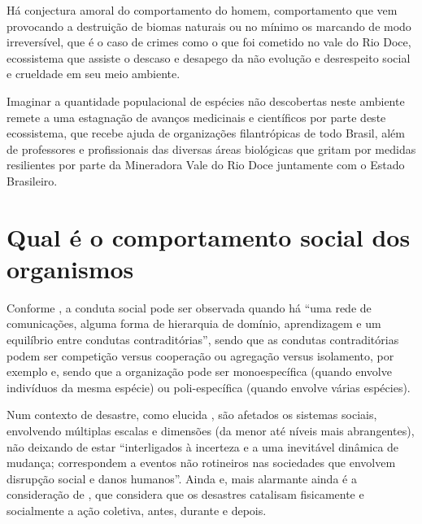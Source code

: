 \documentclass[
article,			%
11pt,				%
oneside,			%
a4paper,			%
english,			%
brazil,				%
sumario=tradicional
]{abntex2}
\begin{document}
	Há conjectura amoral do comportamento do homem, comportamento que vem provocando a destruição de biomas naturais ou no mínimo os marcando de modo irreversível, que é o caso de crimes como o que foi cometido no vale do Rio Doce, ecossistema que assiste o descaso e desapego da não evolução e desrespeito social e crueldade em seu meio ambiente.
	
	Imaginar a quantidade populacional de espécies não descobertas neste ambiente  remete a uma estagnação de avanços medicinais e científicos  por parte deste ecossistema, que recebe ajuda de organizações filantrópicas de todo Brasil, além de professores e profissionais das diversas áreas biológicas que gritam por medidas resilientes por parte da Mineradora Vale do Rio Doce juntamente com o Estado Brasileiro.
	
	\section{Qual é o comportamento social dos organismos} \label{s:comportamento}
	
	Conforme , a conduta social pode ser observada quando há ``uma rede de comunicações, alguma forma de hierarquia de domínio, aprendizagem e um equilíbrio entre condutas contraditórias'', sendo que as condutas contraditórias podem ser competição versus cooperação ou agregação versus isolamento, por exemplo e, sendo que a organização pode ser monoespecífica (quando envolve indivíduos da mesma espécie) ou poli-específica (quando envolve várias espécies).
	
	Num contexto de desastre, como elucida , são afetados os sistemas sociais, envolvendo múltiplas escalas e dimensões (da menor até níveis mais abrangentes), não deixando de estar ``interligados à incerteza e a uma inevitável dinâmica  de  mudança;  correspondem  a  eventos  não rotineiros nas sociedades que envolvem disrupção social e  danos  humanos''. Ainda e, mais alarmante ainda é a consideração de , que considera que os desastres catalisam fisicamente e socialmente a ação coletiva, antes, durante e depois.
	
\end{document}
